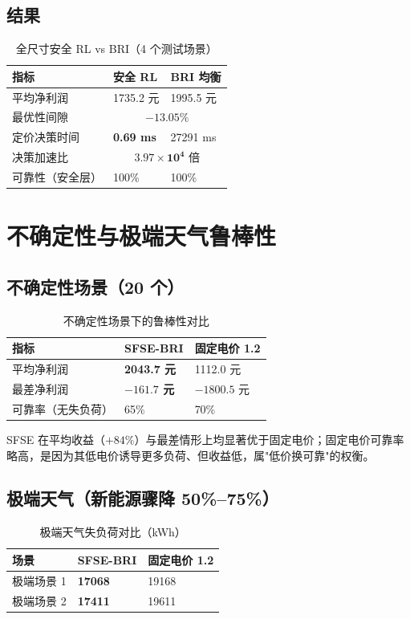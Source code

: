 \documentclass[UTF8,a4paper,11pt]{ctexart}
\begin{document}
\subsection{结果}
\begin{table}[htbp]
\centering
\small
\caption{全尺寸安全 RL vs BRI（4 个测试场景）}
\begin{tabular}{p{4.4cm} p{4.4cm} p{4.4cm}}
\toprule
\textbf{指标} & \textbf{安全 RL} & \textbf{BRI 均衡}\\
\midrule
平均净利润 & 1735.2 元 & 1995.5 元\\
最优性间隙 & \multicolumn{2}{c}{$-13.05\%$}\\
定价决策时间 & \textbf{0.69 ms} & 27291 ms\\
决策加速比 & \multicolumn{2}{c}{$\mathbf{3.97\times10^4}$ 倍}\\
可靠性（安全层） & 100\% & 100\%\\
\bottomrule
\end{tabular}
\end{table}

\section{不确定性与极端天气鲁棒性}

\subsection{不确定性场景（20 个）}
\begin{table}[htbp]
\centering
\small
\caption{不确定性场景下的鲁棒性对比}
\begin{tabular}{p{4.4cm} p{4.6cm} p{4.6cm}}
\toprule
\textbf{指标} & \textbf{SFSE-BRI} & \textbf{固定电价 1.2}\\
\midrule
平均净利润 & \textbf{2043.7 元} & 1112.0 元\\
最差净利润 & \textbf{$-161.7$ 元} & $-1800.5$ 元\\
可靠率（无失负荷） & 65\% & 70\%\\
\bottomrule
\end{tabular}
\end{table}

SFSE 在平均收益（$+84\%$）与最差情形上均显著优于固定电价；固定电价可靠率略高，是因为其低电价诱导更多负荷、但收益低，属"低价换可靠"的权衡。

\subsection{极端天气（新能源骤降 50\%--75\%）}
\begin{table}[htbp]
\centering
\small
\caption{极端天气失负荷对比（kWh）}
\begin{tabular}{p{4.4cm} p{4.4cm} p{4.4cm}}
\toprule
\textbf{场景} & \textbf{SFSE-BRI} & \textbf{固定电价 1.2}\\
\midrule
极端场景 1 & \textbf{17068} & 19168\\
极端场景 2 & \textbf{17411} & 19611\\
\bottomrule
\end{tabular}
\end{table}
\end{document}

